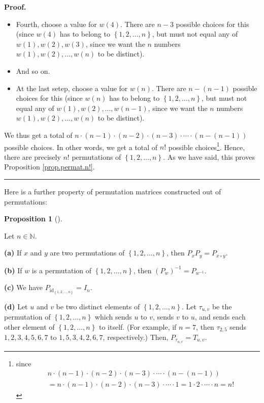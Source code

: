 \documentclass[numbers=enddot,12pt,final,onecolumn,notitlepage]{scrartcl}%
\theoremstyle{definition}
\newtheorem{prop}[theo]{Proposition}
\newenvironment{proposition}[1][]
{\begin{prop}[#1]\begin{leftbar}}
{\end{leftbar}\end{prop}}
\newenvironment{proof}[1][Proof]{\noindent\textbf{#1.} }{\ \rule{0.5em}{0.5em}}
\begin{document}
\begin{proof}
\begin{itemize}
\item Fourth, choose a value for $w\left(  4\right)  $. There are $n-3$
possible choices for this (since $w\left(  4\right)  $ has to belong to
$\left\{  1,2,\ldots,n\right\}  $, but must not equal any of $w\left(
1\right)  ,w\left(  2\right)  ,w\left(  3\right)  $, since we want the $n$
numbers $w\left(  1\right)  ,w\left(  2\right)  ,\ldots,w\left(  n\right)  $
to be distinct).

\item And so on.

\item At the last setep, choose a value for $w\left(  n\right)  $. There are
$n-\left(  n-1\right)  $ possible choices for this (since $w\left(  n\right)
$ has to belong to $\left\{  1,2,\ldots,n\right\}  $, but must not equal any
of $w\left(  1\right)  ,w\left(  2\right)  ,\ldots,w\left(  n-1\right)  $,
since we want the $n$ numbers $w\left(  1\right)  ,w\left(  2\right)
,\ldots,w\left(  n\right)  $ to be distinct).
\end{itemize}

We thus get a total of $n\cdot\left(  n-1\right)  \cdot\left(  n-2\right)
\cdot\left(  n-3\right)  \cdot\cdots\cdot\left(  n-\left(  n-1\right)
\right)  $ possible choices. In other words, we get a total of $n!$ possible
choices\footnote{since
\begin{align*}
&  n\cdot\left(  n-1\right)  \cdot\left(  n-2\right)  \cdot\left(  n-3\right)
\cdot\cdots\cdot\left(  n-\left(  n-1\right)  \right) \\
&  =n\cdot\left(  n-1\right)  \cdot\left(  n-2\right)  \cdot\left(
n-3\right)  \cdot\cdots\cdot1=1\cdot2\cdot\cdots\cdot n=n!
\end{align*}
}. Hence, there are precisely $n!$ permutations of $\left\{  1,2,\ldots
,n\right\}  $. As we have said, this proves Proposition \ref{prop.permat.n!}.
\end{proof}

Here is a further property of permutation matrices constructed out of permutations:

\begin{proposition}
\label{prop.permat.prod-of-perms}Let $n\in\mathbb{N}$.

\textbf{(a)} If $x$ and $y$ are two permutations of $\left\{  1,2,\ldots
,n\right\}  $, then $P_{x}P_{y}=P_{x\circ y}$.

\textbf{(b)} If $w$ is a permutation of $\left\{  1,2,\ldots,n\right\}  $,
then $\left(  P_{w}\right)  ^{-1}=P_{w^{-1}}$.

\textbf{(c)} We have $P_{\operatorname*{id}\nolimits_{\left\{  1,2,\ldots
,n\right\}  }}=I_{n}$.

\textbf{(d)} Let $u$ and $v$ be two distinct elements of $\left\{
1,2,\ldots,n\right\}  $. Let $\tau_{u,v}$ be the permutation of $\left\{
1,2,\ldots,n\right\}  $ which sends $u$ to $v$, sends $v$ to $u$, and sends
each other element of $\left\{  1,2,\ldots,n\right\}  $ to itself. (For
example, if $n=7$, then $\tau_{2,5}$ sends $1,2,3,4,5,6,7$ to $1,5,3,4,2,6,7$,
respectively.) Then, $P_{\tau_{u,v}}=T_{u,v}$.
\end{proposition}
\end{document}
